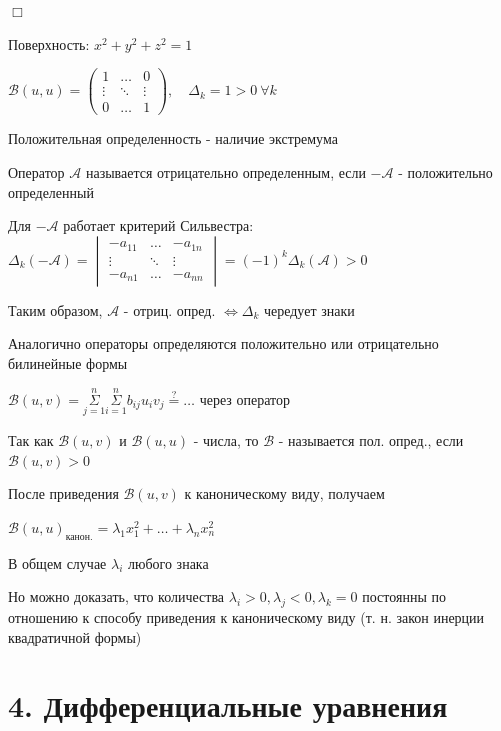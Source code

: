 \documentclass[12pt]{article}
\begin{document}
    $\Box$

    \Ex Поверхность: $\displaystyle x^2 + y^2 + z^2 = 1$

    $\displaystyle \mathcal{B}(u, u) = \begin{pmatrix}1 & \dots & 0 \\ \vdots & \ddots & \vdots \\ 0 & \dots & 1\end{pmatrix},
    \quad \Delta_k = 1 > 0 \ \forall k$

    Положительная определенность - наличие экстремума

    \Def Оператор $\mathcal{A}$ называется отрицательно определенным, если $-\mathcal{A}$ - положительно определенный

    \Nota Для $-\mathcal{A}$ работает критерий Сильвестра: $\displaystyle \Delta_k(-\mathcal{A}) =
    \begin{vmatrix}-a_{11} & \dots & -a_{1n} \\ \vdots & \ddots & \vdots \\ -a_{n1} & \dots & -a_{nn}\end{vmatrix} = (-1)^k \Delta_k (\mathcal{A}) > 0$

    Таким образом, $\mathcal{A}$ - отриц. опред. $\displaystyle \Longleftrightarrow \Delta_k$ чередует знаки

    \Nota Аналогично операторы определяются положительно или отрицательно билинейные формы

    $\displaystyle \mathcal{B}(u, v) = \overset{n}{\underset{j = 1}{\Sigma}}\overset{n}{\underset{i = 1}{\Sigma}} b_{ij} u_i v_j \stackrel{?}{=} \dots$ через оператор

    Так как $\mathcal{B}(u, v)$ и  $\mathcal{B}(u, u)$ - числа, то $\mathcal{B}$ - называется пол. опред., если $\mathcal{B}(u, v) > 0$

    \Nota После приведения $\mathcal{B}(u, v)$ к каноническому виду, получаем

    $\displaystyle \mathcal{B}(u, u)_{\text{канон.}} = \lambda_1 x_1^2 + \dots + \lambda_n x_n^2$

    В общем случае $\displaystyle \lambda_i$ любого знака

    Но можно доказать, что количества $\displaystyle \lambda_i > 0, \lambda_j < 0, \lambda_k = 0$ постоянны по отношению к способу приведения
    к каноническому виду (т. н. закон инерции квадратичной формы)



    \section{4. Дифференциальные уравнения}
\end{document}

